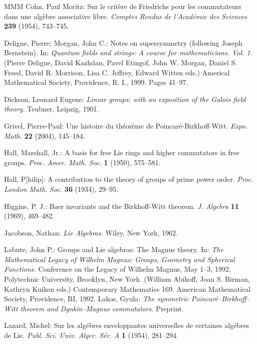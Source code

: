 \documentclass[11pt,a4paper]{amsart}
\newcommand{\gbibitem}[1]{ \bibitem{#1}}
\newcommand{\gbibitem}[1]{ \bibitem{#1}\rlap{\smash{${}^{^{[#1]}}$}}}
\newcommand{\gbibitem}[1]{ \bibitem{#1}}
\theoremstyle{definition}
\theoremstyle{plain}
\begin{document}
\begin{thebibliography}{MMM}
\gbibitem{CC2}
Cohn, Paul Moritz:
 Sur le crit\`ere de Friedrichs pour les commutateurs dans une alg\`ebre associative libre.
\textit{Comptes Rendus de l'Académie des Sciences}  \textbf{239} (1954),
743--745.


\gbibitem{DMB}
Deligne, Pierre; Morgan, John C.: Notes on supersymmetry (following Joseph Bernstein).
In: \textit{Quantum fields and strings: A course for mathematicians. Vol. 1.}
(Pierre Deligne, David Kazhdan,
Pavel Etingof,  John W. Morgan, Daniel S. Freed, David R. Morrison, Lisa C. Jeffrey, Edward Witten eds.)
Americal Mathematical Society, Providence, R. I., 1999.
Pages 41--97.



\gbibitem{DD}
Dickson, Leonard Eugene:
\textit{Linear groups: with an exposition of the Galois field theory.}
Teubner, Leipzig, 1901.




\gbibitem{G}
Grivel, Pierre-Paul:
Une histoire du th\'eor\`eme de Poincar\'e-Birkhoff-Witt.
\textit{Expo. Math.}  \textbf{22}  (2004),   145--184.

\gbibitem{Ha}
Hall, Marshall, Jr.:
A basis for free Lie rings and higher commutators in free groups.
\textit{Proc. Amer. Math. Soc. } \textbf{1}  (1950), 575--581.

\gbibitem{Ha0} Hall, P[hilip]: A contribution to the theory of groups of prime power order.
 \textit{Proc. London Math. Soc.} \textbf{36} (1934), 29--95.

\gbibitem{H}
Higgins, P. J.:
Baer invariants and the Birkhoff-Witt theorem.
\textit{J. Algebra}  \textbf{11}  (1969), 469--482.

\gbibitem{J}
Jacobson, Nathan: \textit{Lie Algebras.} Wiley, New York, 1962.

\gbibitem{Lab} Labute, John P.:
Groups and Lie algebras: The Magnus theory.
In: \textit{The Mathematical Legacy of Wilhelm Magnus: Groups, Geometry and Spherical Functions.}
Conference on the
Legacy of Wilhelm Magnus,
May 1--3, 1992;
Polytechnic University,
Brooklyn, New York.
(William Abikoff, Joan S. Birman, Kathryn Kuiken eds.)
Contemporary Mathematics 169. American Mathematical Society, Providence, RI, 1992.
\gbibitem{LLX}
Lakos, Gyula:
\textit{The symmetric Poincaré--Birkhoff--Witt theorem and Dynkin--Magnus commutators.}
Preprint.


\gbibitem{L}
Lazard, Michel:
Sur les alg\'ebres enveloppantes universelles de certaines alg\'ebres de Lie.
\textit{Publ. Sci. Univ. Alger. S\'er. A}  \textbf{1}  (1954), 281--294.



\end{thebibliography}
\end{document}

